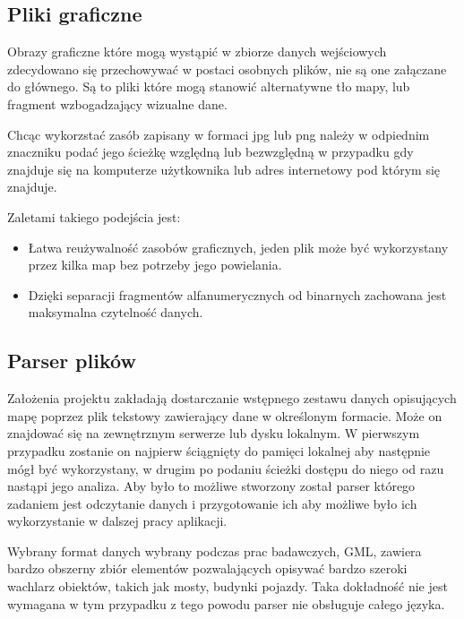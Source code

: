 \subsection{Pliki graficzne}
\label{subsec:plikigraficzne}

Obrazy graficzne które mogą wystąpić w zbiorze danych wejściowych zdecydowano się przechowywać w postaci osobnych plików, nie są one załączane do głównego. Są to pliki które mogą stanowić alternatywne tło mapy, lub fragment wzbogadzający wizualne dane.

Chcąc wykorzstać zasób zapisany w formaci jpg lub png należy w odpiednim znaczniku podać jego ścieżkę względną lub bezwzględną w przypadku gdy znajduje się na komputerze użytkownika lub adres internetowy pod którym się znajduje.

Zaletami takiego podejścia jest:
\begin{itemize}

\item
Łatwa reużywalność zasobów graficznych, jeden plik może być wykorzystany przez kilka map bez potrzeby jego powielania.

\item
Dzięki separacji fragmentów alfanumerycznych od binarnych zachowana jest maksymalna czytelność danych.

\end{itemize}

\subsection{Parser plików}
\label{subsec:parser}

Założenia projektu zakładają dostarczanie wstępnego zestawu danych opisujących mapę poprzez plik tekstowy zawierający dane w określonym formacie. Może on znajdować się na zewnętrznym serwerze lub dysku lokalnym. W pierwszym przypadku zostanie on najpierw ściągnięty do pamięci lokalnej aby następnie mógł być wykorzystany, w drugim po podaniu ścieżki dostępu do niego  od razu nastąpi jego analiza. Aby było to możliwe stworzony został parser którego zadaniem jest odczytanie danych i przygotowanie ich aby możliwe było ich wykorzystanie w dalszej pracy aplikacji.

Wybrany format danych wybrany podczas prac badawczych, GML, zawiera bardzo obszerny zbiór elementów pozwalających opisywać bardzo szeroki wachlarz obiektów, takich jak mosty, budynki pojazdy. Taka dokładność nie jest wymagana w tym przypadku z tego powodu parser nie obsługuje całego języka. 

